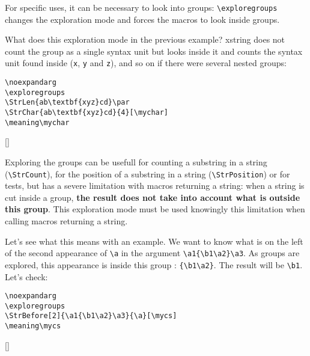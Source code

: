 \documentclass[english,a4paper,10pt]{article}
\newcommand\US{syntax unit\xspace}
\newcommand\Xstring{\textsf{xstring}\xspace}
\newcommand\styleexercice{\footnotesize}
\newcommand\verbinline{\lstinline[basicstyle=\normalsize\ttfamily]}
\begin{document}
For specific uses, it can be necessary to look into groups: \verbinline|\exploregroups| changes the exploration mode and forces the macros to look inside groups.\medskip

What does this exploration mode in the previous example? \Xstring does not count the group as a single \US but looks inside it and counts the \US found inside (\verb|x|, \verb|y| and \verb|z|), and so on if there were several nested groups:\smallskip

\nobreak\smallskip
\begin{minipage}[c]{0.65\linewidth}
\begin{lstlisting}
\noexpandarg
\exploregroups
\StrLen{ab\textbf{xyz}cd}\par
\StrChar{ab\textbf{xyz}cd}{4}[\mychar]
\meaning\mychar
\end{lstlisting}%
\end{minipage}\hfill
\begin{minipage}[c]{0.35\linewidth}
	\styleexercice
	\noexpandarg
	\exploregroups
	\par
	[\mychar]
	\meaning\mychar
\end{minipage}%
\fullexpandarg\noexploregroups
\medskip

Exploring the groups can be usefull for counting a substring in a string (\verbinline|\StrCount|), for the position of a substring in a string (\verbinline|\StrPosition|) or for tests, but has a severe limitation with macros returning a string: when a string is cut inside a group, \textbf{the result does not take into account what is outside this group}. This exploration mode must be used knowingly this limitation when calling macros returning a string.\smallskip

Let's see what this means with an example. We want to know what is on the left of the second appearance of \verb|\a| in the argument \verb|\a1{\b1\a2}\a3|. As groups are explored, this appearance is inside this group : \verb|{\b1\a2}|. The result will be \verb|\b1|. Let's check:\par\nobreak\smallskip
\begin{minipage}[c]{0.65\linewidth}
\begin{lstlisting}
\noexpandarg
\exploregroups
\StrBefore[2]{\a1{\b1\a2}\a3}{\a}[\mycs]
\meaning\mycs
\end{lstlisting}%
\end{minipage}\hfill
\begin{minipage}[c]{0.35\linewidth}
	\styleexercice
	\noexpandarg
	\exploregroups
	[\mycs]
	\meaning\mycs
\end{minipage}%
\medskip
\end{document}
